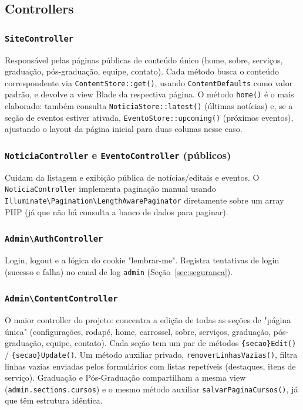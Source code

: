 \documentclass[11pt,a4paper]{article}
\begin{document}
\subsection{Controllers}

\subsubsection{\texttt{SiteController}}
Responsável pelas páginas públicas de conteúdo único (home, sobre, serviços, graduação,
pós-graduação, equipe, contato). Cada método busca o conteúdo correspondente via
\texttt{ContentStore::get()}, usando \texttt{ContentDefaults} como valor padrão, e devolve a
view Blade da respectiva página. O método \texttt{home()} é o mais elaborado: também consulta
\texttt{NoticiaStore::latest()} (últimas notícias) e, se a seção de eventos estiver ativada,
\texttt{EventoStore::upcoming()} (próximos eventos), ajustando o layout da página inicial para
duas colunas nesse caso.

\subsubsection{\texttt{NoticiaController} e \texttt{EventoController} (públicos)}
Cuidam da listagem e exibição pública de notícias/editais e eventos. O \texttt{NoticiaController}
implementa paginação manual usando \texttt{Illuminate\textbackslash Pagination\textbackslash LengthAwarePaginator}
diretamente sobre um array PHP (já que não há consulta a banco de dados para paginar).

\subsubsection{\texttt{Admin\textbackslash AuthController}}
Login, logout e a lógica do cookie "lembrar-me". Registra tentativas de login (sucesso e falha)
no canal de log \texttt{admin} (Seção~\ref{sec:seguranca}).

\subsubsection{\texttt{Admin\textbackslash ContentController}}
O maior controller do projeto: concentra a edição de todas as seções de "página única"
(configurações, rodapé, home, carrossel, sobre, serviços, graduação, pós-graduação, equipe,
contato). Cada seção tem um par de métodos \texttt{\{secao\}Edit()} / \texttt{\{secao\}Update()}.
Um método auxiliar privado, \texttt{removerLinhasVazias()}, filtra linhas vazias enviadas pelos
formulários com listas repetíveis (destaques, itens de serviço). Graduação e Pós-Graduação
compartilham a mesma view (\texttt{admin.sections.cursos}) e o mesmo método auxiliar
\texttt{salvarPaginaCursos()}, já que têm estrutura idêntica.
\end{document}
